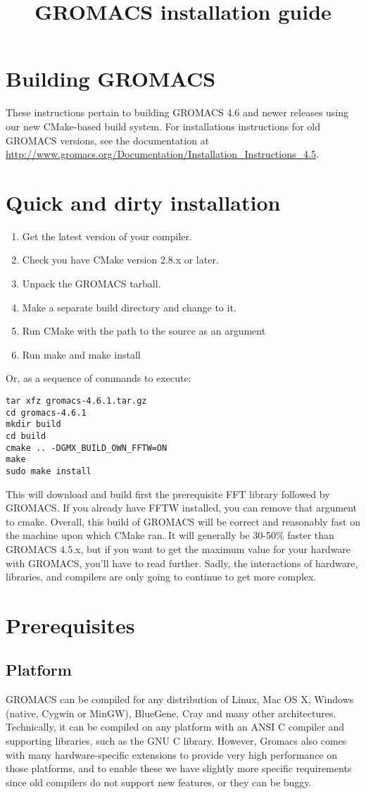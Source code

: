 \documentclass{article}[12pt,a4paper,twoside]
\title{GROMACS installation guide}
\newcommand{\gromacs}{GROMACS}
\newcommand{\cmake}{CMake}
\begin{document}
\section{Building GROMACS}

These instructions pertain to building \gromacs{} 4.6 and newer releases
using our new CMake-based build system. 
For installations instructions for old \gromacs{} versions,
see the documentation at
\url{http://www.gromacs.org/Documentation/Installation_Instructions_4.5}.

\section{Quick and dirty installation}

\begin{enumerate}
\item Get the latest version of your compiler.
\item Check you have \cmake{} version 2.8.x or later.
\item Unpack the \gromacs{} tarball.
\item Make a separate build directory and change to it. 
\item Run \cmake{} with the path to the source as an argument
\item Run make and make install
\end{enumerate}
Or, as a sequence of commands to execute:
\begin{verbatim}
tar xfz gromacs-4.6.1.tar.gz
cd gromacs-4.6.1
mkdir build
cd build
cmake .. -DGMX_BUILD_OWN_FFTW=ON
make
sudo make install
\end{verbatim}
This will download and build first the prerequisite FFT library followed by \gromacs{}. If you already have
FFTW installed, you can remove that argument to cmake. Overall, this build 
of \gromacs{} will be correct and reasonably fast on the
machine upon which \cmake{} ran. It will generally be 30-50\% faster
than \gromacs{} 4.5.x, but if you want to get the maximum value
for your hardware with \gromacs{}, you'll have to read further.
Sadly, the interactions of hardware, libraries, and compilers
are only going to continue to get more complex. 

\section{Prerequisites}
\subsection{Platform}
\gromacs{} can be compiled for any distribution of Linux, Mac OS X,
Windows (native, Cygwin or MinGW), BlueGene, Cray and many other architectures.
Technically, it can be compiled on any platform with an ANSI C
compiler and supporting libraries, such as the GNU C library. However, Gromacs
also comes with many hardware-specific extensions to provide very high performance
on those platforms, and to enable these we have slightly more specific requirements
since old compilers do not support new features, or they can be buggy.
\end{document}
